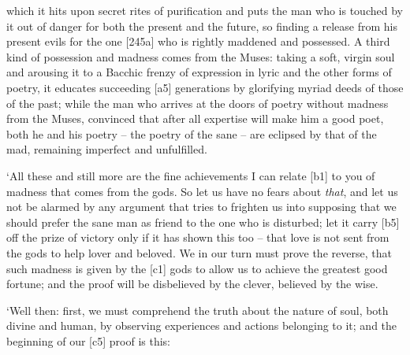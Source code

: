 which it hits upon secret rites of purification and puts the man who is
touched by it out of
danger for both the present and the future, so finding a release from
his present evils for the one {[}245a{]} who is rightly maddened and
possessed. A third kind of possession and madness comes from the
Muses: taking a soft,
virgin soul and arousing it to a Bacchic frenzy of expression in lyric
and the other forms of poetry, it educates succeeding {[}a5{]}
generations by glorifying myriad deeds of those of the past; while the
man who arrives at the doors of poetry without madness from the Muses,
convinced that after all expertise will make him a good poet, both he
and his poetry -- the poetry of the sane -- are eclipsed by that of the
mad, remaining imperfect and unfulfilled.

‘All these and still more are the fine achievements I can relate
{[}b1{]} to you of madness that comes from the gods. So let us have no
fears about {\em that}, and let us not be alarmed by any argument that
tries to frighten us into supposing that we should prefer the sane man
as friend to the one who is disturbed; let it carry {[}b5{]} off the
prize of victory only if it has shown this too -- that love is not sent
from the gods to help lover and beloved. We in our turn must prove the
reverse, that such madness is given by the {[}c1{]} gods to allow us to
achieve the greatest good fortune; and the proof will be disbelieved by
the clever, believed by the wise.

‘Well then: first, we must comprehend the truth about the nature of
soul, both divine and human, by observing experiences and actions
belonging to it; and the beginning of our {[}c5{]} proof is this:

